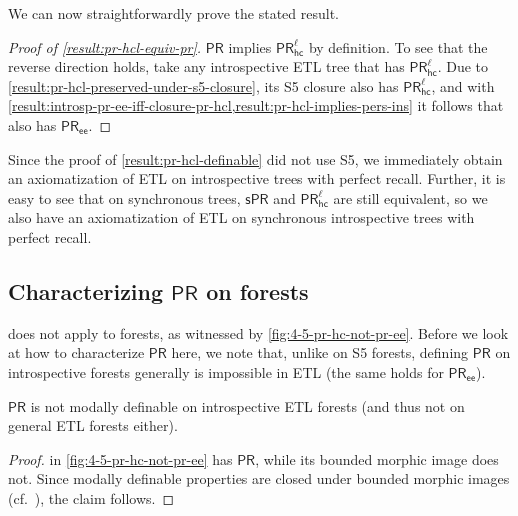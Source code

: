 \documentclass{article}
\newcommand{\PR}{\ensuremath{\mathsf{PR}}\xspace}
\newcommand{\PRs}{\ensuremath{\mathsf{sPR}}\xspace}
\newcommand{\PRhcl}{\ensuremath{\mathsf{PR_{hc}^\ell}}\xspace}
\newcommand{\PRee}{\ensuremath{\mathsf{PR_{ee}}}\xspace}
\newcounter{#1}
\begin{document}
We can now straightforwardly prove the stated result.
\begin{proof}[Proof of \cref{result:pr-hcl-equiv-pr}]
  \PR implies \PRhcl by definition.
  To see that the reverse direction holds,
  take any introspective ETL tree \F that has \PRhcl.
  Due to \cref{result:pr-hcl-preserved-under-s5-closure},
  its S5 closure also has \PRhcl,
  and with \cref{result:introsp-pr-ee-iff-closure-pr-hcl,result:pr-hcl-implies-pers-ins}
  it follows that \F also has \PRee.
\end{proof}















\medskip



Since the proof of \cref{result:pr-hcl-definable} did not use S5,
we immediately obtain an axiomatization of ETL
on introspective trees with perfect recall.
Further, it is easy to see that on synchronous trees, \PRs and \PRhcl are still equivalent,
so we also have an axiomatization of ETL on synchronous introspective trees with perfect recall.

\subsection{Characterizing \PR on forests}
\label{sec:char-pr-forests}

 does not apply to forests,
as witnessed by \cref{fig:4-5-pr-hc-not-pr-ee}.
Before we look at how to characterize \PR here,
we note that, unlike on S5 forests, defining \PR on introspective forests generally is impossible in ETL
(the same holds for \PRee).

\begin{proposition}
  \PR is not modally definable on introspective ETL forests
  (and thus not on general ETL forests either).
\end{proposition}
\begin{proof}
   in \cref{fig:4-5-pr-hc-not-pr-ee} has \PR,
  while its bounded morphic image \F does not.
  Since modally definable properties are closed under bounded morphic images
  (cf.~\cite{blackburn_modal_2001}),
  the claim follows.
\end{proof}
\end{document}
